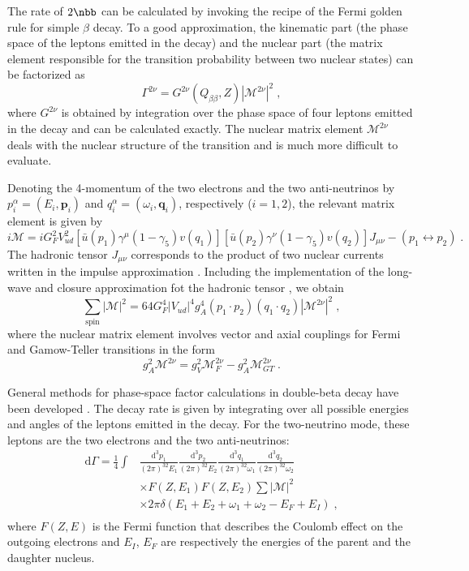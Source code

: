The rate of $2\nbb$ can be calculated by invoking the recipe of the Fermi golden rule for simple $\beta$ decay. To a good approximation, the kinematic part (the phase space of the leptons emitted in the decay) and the nuclear part (the matrix element responsible for the transition probability between two nuclear states) can be factorized as
\[\Gamma^{2\nu}=G^{2\nu}(Q_{\beta\beta},Z)|\mathcal{M}^{2\nu}|^2\;,\]
where $G^{2\nu}$ is obtained by integration over the phase space of four leptons emitted in the decay and can be calculated exactly. The nuclear matrix element $\mathcal{M}^{2\nu}$ deals with the nuclear structure of the transition and is much more difficult to evaluate.

Denoting the 4-momentum of the two electrons and the two anti-neutrinos by $p^\alpha_i=(E_i,\mathbf{p}_i)$ and $q^\alpha_i=(\omega_i,\mathbf{q}_i)$, respectively ($i=1,2$), the relevant matrix element is given by
\[i\mathcal{M}=iG^2_FV^2_{ud}[\bar{u}(p_1)\gamma^\mu(1-\gamma_5)v(q_1)][\bar{u}(p_2)\gamma^\nu(1-\gamma_5)v(q_2)]J_{\mu\nu}-(p_1\leftrightarrow p_2)\;.\]
The hadronic tensor $J_{\mu\nu}$ corresponds to the product of two nuclear currents written in the impulse approximation \cite{Tomoda:1991}. Including the implementation of the long-wave and closure approximation fot the hadronic tensor \cite{Tomoda:1991}, we obtain
\[\sum_\text{spin}|\mathcal{M}|^2=64G^4_F|V_{ud}|^4g^4_A(p_1\cdot p_2)(q_1\cdot q_2)|\mathcal{M}^{2\nu}|^2\;,\]
where the nuclear matrix element involves vector and axial couplings for Fermi and Gamow-Teller transitions in the form
\[g^2_A\mathcal{M}^{2\nu}=g^2_V\mathcal{M}^{2\nu}_F-g^2_A\mathcal{M}^{2\nu}_{GT}\;.\]

General methods for phase-space factor calculations in double-beta decay have been developed \cite{Doi:1981,Doi:1983,Tomoda:1991}. The decay rate is given by integrating over all possible energies and angles of the leptons emitted in the decay. For the two-neutrino mode, these leptons are the two electrons and the two anti-neutrinos:
\[\begin{split}
		\text{d}\Gamma=\frac{1}{4}\int & \frac{\text{d}^3p_1}{(2\pi)^32E_1}\frac{\text{d}^3p_2}{(2\pi)^32E_2}\frac{\text{d}^3q_1}{(2\pi)^32\omega_1}\frac{\text{d}^3q_2}{(2\pi)^32\omega_2} \\
									   & \times F(Z,E_1)F(Z,E_2)\sum|\mathcal{M}|^2 \\
									   & \times 2\pi\delta(E_1+E_2+\omega_1+\omega_2-E_F+E_I)\;, \\
\end{split}\]
where $F(Z,E)$ is the Fermi function that describes the Coulomb effect on the outgoing electrons and $E_I$, $E_F$ are respectively the energies of the parent and the daughter nucleus.

